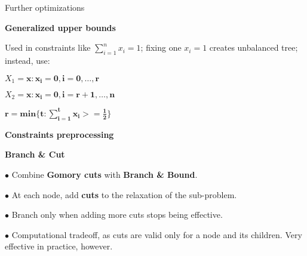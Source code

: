 \documentclass[13pt]{beamer}
\begin{document}
\begin{frame}{Further optimizations}
    \begin{fullpageitemize}
         \item<1->[\rtarrow]\textbf{Generalized upper bounds}
         \begin{baseitemize}
             \item<2->Used in constraints like $\sum_{i=1}^n{x_i}=1$; fixing one $x_i = 1$ creates unbalanced tree; instead, use:
             \item<3->$X_1 = \mathbf{x: x_i = 0,  i=0,\ldots, r}$
             \item<3->$X_2 = \mathbf{x: x_i = 0,  i=r+1,\ldots, n}$
             \item<3->$\mathbf{r = min\{t: \sum_{i=1}^t{x_i} >= \frac{1}{2}\}}$
         \end{baseitemize}	
         \item<4->[\rtarrow]\textbf{Constraints preprocessing}
         \item<5->[\rtarrow]\textbf{Branch \& Cut}
         \begin{baseitemize}
             \item<6->$\bullet$ Combine \textbf{Gomory cuts} with \textbf{Branch \& Bound}.
             \item<7->$\bullet$ At each node, add \textbf{cuts} to the relaxation of the sub-problem.
             \item<8->$\bullet$ Branch only when adding more cuts stops being effective.
             \item<9->$\bullet$ Computational tradeoff, as cuts are valid only for a node and its children. Very effective in practice, however.
         \end{baseitemize}
     \end{fullpageitemize}
 \end{frame}      
\end{document}
